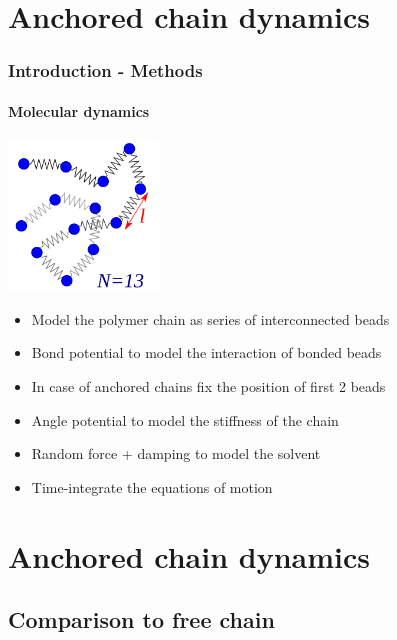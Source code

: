 \documentclass[handout]{beamer}
\begin{document}
\section{Anchored chain dynamics}


\begin{frame}
    \frametitle{Introduction - Methods}
    \framesubtitle{Molecular dynamics}
    \centering
    \includegraphics[width=0.3\textwidth]{./bead_spring_model.png}
    \begin{itemize}
        \item Model the polymer chain as series of interconnected beads
        \item Bond potential to model the interaction of bonded beads
        \item In case of anchored chains fix the position of first 2 beads
        \item Angle potential to model the stiffness of the chain
        \item Random force + damping to model the solvent
        \item Time-integrate the equations of motion
    \end{itemize}
    
\end{frame}

\section{Anchored chain dynamics}




\subsection{Comparison to free chain}
\end{document}

